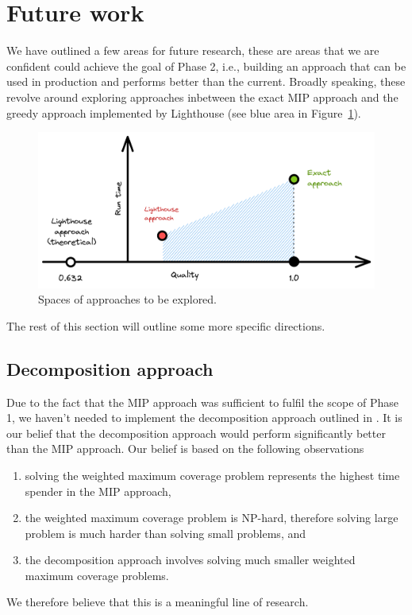 \documentclass{article}
\begin{document}
\section{Future work} \label{sec:next}

We have outlined a few areas for future research, these are areas that we are
confident could achieve the goal of Phase 2, i.e., building an approach that
can be used in production and performs better than the current. Broadly
speaking, these revolve around exploring approaches inbetween the exact MIP
approach and the greedy approach implemented by Lighthouse (see
blue area in Figure~\ref{fig:future}).
%
\begin{figure}[!ht]
  \centering
  \includegraphics[width=.8\textwidth]{future.png}
  \caption{Spaces of approaches to be explored.\label{fig:future}}
\end{figure}
%
The rest of this section will outline some more specific directions.

\subsection{Decomposition approach}

Due to the fact that the MIP approach was sufficient to fulfil the scope of
Phase 1, we haven't needed to implement the decomposition approach outlined in
\cite{Satalia22b}. It is our belief that the decomposition approach
would perform significantly better than the MIP approach. Our belief is based
on the following observations
\begin{enumerate}
  \item solving the weighted maximum coverage problem represents the highest
  time spender in the MIP approach,
  \item the weighted maximum coverage problem is NP-hard, therefore solving
  large problem is much harder than solving small problems, and
  \item the decomposition approach involves solving much smaller weighted
  maximum coverage problems.
\end{enumerate}
We therefore believe that this is a meaningful line of research.
\end{document}

